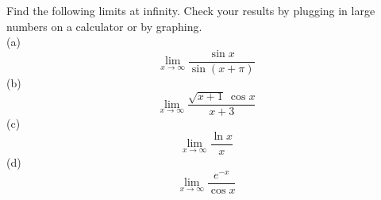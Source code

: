 Find the following limits at infinity. Check your results by plugging in large numbers on a calculator
or by graphing.\\
(a)
\begin{equation*}
  \lim_{x\rightarrow \infty} \frac{\sin x}{\sin(x+\pi)}
\end{equation*}
(b)
\begin{equation*}
  \lim_{x\rightarrow \infty} \frac{\sqrt{x+1}\:\cos x}{x+3}
\end{equation*}
(c)
\begin{equation*}
  \lim_{x\rightarrow \infty} \frac{\ln x}{x}
\end{equation*}
(d)
\begin{equation*}
  \lim_{x\rightarrow \infty} \frac{e^{-x}}{\cos x}
\end{equation*}
\answercheck
